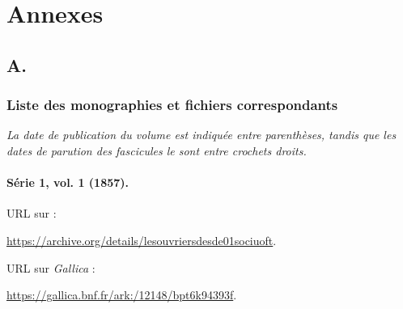 \part*{Annexes}
\appendix
\renewcommand{\thechapter}{A}
\chapter{A. \lodm}

\section{Liste des monographies et fichiers correspondants}
\label{mapping}

\textit{La date de publication du volume est indiquée entre parenthèses, tandis que les dates de parution des fascicules le sont entre crochets droits.}

\subsection{Série 1, vol. 1 (1857).}
\label{mappings1t1}

URL sur \ia{} : 

\url{https://archive.org/details/lesouvriersdesde01sociuoft}.

URL sur \textit{Gallica} : 

\url{https://gallica.bnf.fr/ark:/12148/bpt6k94393f}.

